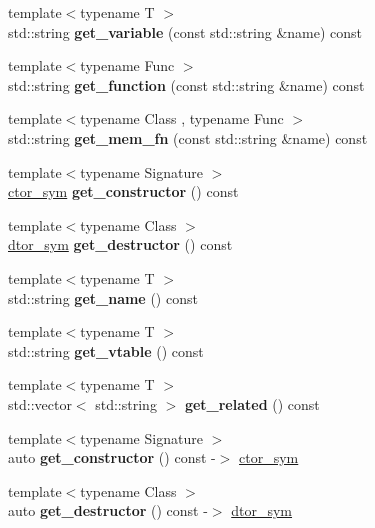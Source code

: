 \begin{DoxyCompactItemize}
{\footnotesize template$<$typename T $>$ }\\std\+::string {\bfseries get\+\_\+variable} (const std\+::string \&name) const
\item 
\mbox{\label{a01364_a67b1e39b2894517898622344a84dfc29}} 
{\footnotesize template$<$typename Func $>$ }\\std\+::string {\bfseries get\+\_\+function} (const std\+::string \&name) const
\item 
\mbox{\label{a01364_a86174e9c81817ca73268dd4e8fdabfa8}} 
{\footnotesize template$<$typename Class , typename Func $>$ }\\std\+::string {\bfseries get\+\_\+mem\+\_\+fn} (const std\+::string \&name) const
\item 
\mbox{\label{a01364_a35d77f954894cd648e6c8de4ec0fab2b}} 
{\footnotesize template$<$typename Signature $>$ }\\\hyperlink{a01372}{ctor\+\_\+sym} {\bfseries get\+\_\+constructor} () const
\item 
\mbox{\label{a01364_a1547d44546d8f2861b50c20076352e4a}} 
{\footnotesize template$<$typename Class $>$ }\\\hyperlink{a01376}{dtor\+\_\+sym} {\bfseries get\+\_\+destructor} () const
\item 
\mbox{\label{a01364_ae35e9aea4a2e277519dec11065dad3f6}} 
{\footnotesize template$<$typename T $>$ }\\std\+::string {\bfseries get\+\_\+name} () const
\item 
\mbox{\label{a01364_aac94b7f6af4f3d8369bbf53e951b1f6c}} 
{\footnotesize template$<$typename T $>$ }\\std\+::string {\bfseries get\+\_\+vtable} () const
\item 
\mbox{\label{a01364_aa58bab76439e7fa2cf3d1c49c7af3261}} 
{\footnotesize template$<$typename T $>$ }\\std\+::vector$<$ std\+::string $>$ {\bfseries get\+\_\+related} () const
\item 
\mbox{\label{a01364_a127e37c0957bfa901b7272b978d91935}} 
{\footnotesize template$<$typename Signature $>$ }\\auto {\bfseries get\+\_\+constructor} () const -\/$>$ \hyperlink{a01372}{ctor\+\_\+sym}
\item 
\mbox{\label{a01364_a40de4301422e1facb3c7e7c2c86e1835}} 
{\footnotesize template$<$typename Class $>$ }\\auto {\bfseries get\+\_\+destructor} () const -\/$>$ \hyperlink{a01376}{dtor\+\_\+sym}
\end{DoxyCompactItemize}
